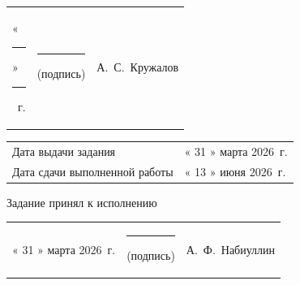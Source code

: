\documentclass[14pt, a4paper]{extarticle}
\begin{document}
{
\renewcommand{\arraystretch}{2}
\noindent
\begin{tabularx}{\textwidth}{@{} P{0.45\textwidth} P{0.3\textwidth} P{0.25\textwidth} @{}}

    «\rule{0.8cm}{0.4pt}» \quad \rule{2cm}{0.4pt} ~г. &
    \centering \rule{3.5cm}{0.4pt} \par \footnotesize (подпись) &
    \hfill А.~С.~Кружалов                                         \\
\end{tabularx}

\begin{tabularx}{\textwidth}{@{} P{0.45\textwidth} P{0.55\textwidth} @{}}
    Дата выдачи задания           &
    \hfill « 31 » марта 2026~г. \\

    Дата сдачи выполненной работы &
    \hfill « 13 » июня 2026~г. \\
\end{tabularx}
}

Задание принял к исполнению

{
\renewcommand{\arraystretch}{1.5}
\begin{tabularx}{\textwidth}{@{} P{0.45\textwidth} P{0.3\textwidth} P{0.25\textwidth} @{}}

    « 31 » марта 2026~г. &
    \centering \rule{3.5cm}{0.4pt} \par \footnotesize (подпись) &
    \hfill А.~Ф.~Набиуллин                                            \\
\end{tabularx}
}
\end{document}
